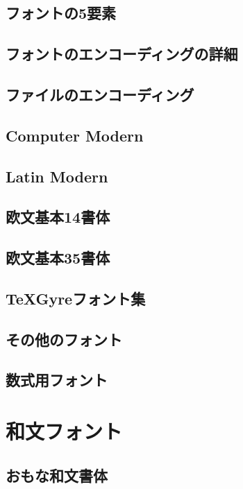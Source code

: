 \documentclass{jsbook}
\begin{document}
\section{フォントの5要素}

\section{フォントのエンコーディングの詳細}

\section{ファイルのエンコーディング}

\section{Computer Modern}

\section{Latin Modern}

\section{欧文基本14書体}

\section{欧文基本35書体}

\section{\TeX Gyreフォント集}

\section{その他のフォント}

\section{数式用フォント}

\chapter{和文フォント}

\section{おもな和文書体}
\end{document}
